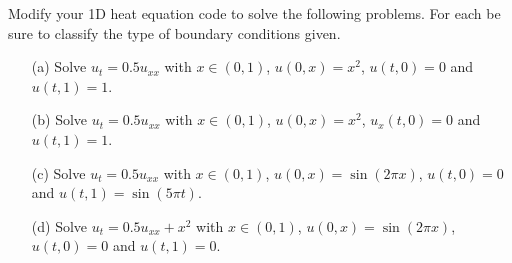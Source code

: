 \begin{problem}
    Modify your 1D heat equation code to solve the following problems.  For each be sure
    to classify the type of boundary conditions given.
    \begin{enumerate}
        \item[(a)] Solve $u_t = 0.5 u_{xx}$ with $x \in (0,1)$, $u(0,x) = x^2$, $u(t,0) =
            0$ and $u(t,1) = 1$.
        \item[(b)] Solve $u_t = 0.5 u_{xx}$ with $x \in (0,1)$, $u(0,x) = x^2$, $u_x(t,0) =
            0$ and $u(t,1) = 1$.
        \item[(c)] Solve $u_t = 0.5 u_{xx}$ with $x \in (0,1)$, $u(0,x) = \sin(2\pi x)$, $u(t,0) =
            0$ and $u(t,1) = \sin(5\pi t)$.
        \item[(d)] Solve $u_t = 0.5 u_{xx}+x^2$ with $x \in (0,1)$, $u(0,x) = \sin(2\pi x)$, $u(t,0) =
            0$ and $u(t,1) = 0$.
    \end{enumerate}
\end{problem}


